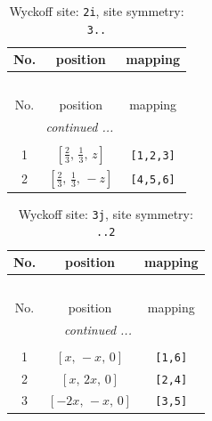 \documentclass[fleqn,8pt]{jsarticle}
\begin{document}
\begin{longtable}{ccc}
\caption{Wyckoff site: {\tt 2i}, site symmetry: {\tt 3..}}
 \\
 \hline \hline
No. & position & mapping \\ \hline \endfirsthead

\multicolumn{2}{l}{\tablename\ \thetable{}} \\
 \hline \hline
No. & position & mapping \\ \hline \endhead

 \hline \hline
\multicolumn{2}{r}{\footnotesize\it continued ...} \\ \endfoot

 \hline \hline
\multicolumn{2}{r}{} \\ \endlastfoot

1 & $\left[ \frac{2}{3},\, \frac{1}{3},\, z \right]$ & {\tt [1,2,3]} \\ \hline
2 & $\left[ \frac{2}{3},\, \frac{1}{3},\, - z \right]$ & {\tt [4,5,6]} \\
\end{longtable}
\renewcommand{\arraystretch}{1.2}
\begin{longtable}{ccc}
\caption{Wyckoff site: {\tt 3j}, site symmetry: {\tt ..2}}
 \\
 \hline \hline
No. & position & mapping \\ \hline \endfirsthead

\multicolumn{2}{l}{\tablename\ \thetable{}} \\
 \hline \hline
No. & position & mapping \\ \hline \endhead

 \hline \hline
\multicolumn{2}{r}{\footnotesize\it continued ...} \\ \endfoot

 \hline \hline
\multicolumn{2}{r}{} \\ \endlastfoot

1 & $\left[ x,\, - x,\, 0 \right]$ & {\tt [1,6]} \\ \hline
2 & $\left[ x,\, 2 x,\, 0 \right]$ & {\tt [2,4]} \\ \hline
3 & $\left[ - 2 x,\, - x,\, 0 \right]$ & {\tt [3,5]} \\
\end{longtable}
\renewcommand{\arraystretch}{1.2}
\end{document}
